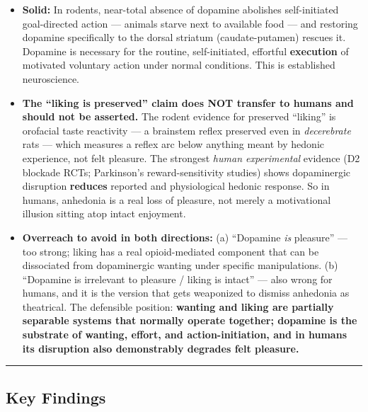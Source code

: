 \begin{itemize}
\tightlist
\item
  \textbf{Solid:} In rodents, near-total absence of dopamine abolishes self-initiated goal-directed action --- animals starve next to available food --- and restoring dopamine specifically to the dorsal striatum (caudate-putamen) rescues it. Dopamine is necessary for the routine, self-initiated, effortful \textbf{execution} of motivated voluntary action under normal conditions. This is established neuroscience.
\item
  \textbf{The ``liking is preserved'' claim does NOT transfer to humans and should not be asserted.} The rodent evidence for preserved ``liking'' is orofacial taste reactivity --- a brainstem reflex preserved even in \emph{decerebrate} rats --- which measures a reflex arc below anything meant by hedonic experience, not felt pleasure. The strongest \emph{human experimental} evidence (D2 blockade RCTs; Parkinson's reward-sensitivity studies) shows dopaminergic disruption \textbf{reduces} reported and physiological hedonic response. So in humans, anhedonia is a real loss of pleasure, not merely a motivational illusion sitting atop intact enjoyment.
\item
  \textbf{Overreach to avoid in both directions:} (a) ``Dopamine \emph{is} pleasure'' --- too strong; liking has a real opioid-mediated component that can be dissociated from dopaminergic wanting under specific manipulations. (b) ``Dopamine is irrelevant to pleasure / liking is intact'' --- also wrong for humans, and it is the version that gets weaponized to dismiss anhedonia as theatrical. The defensible position: \textbf{wanting and liking are partially separable systems that normally operate together; dopamine is the substrate of wanting, effort, and action-initiation, and in humans its disruption also demonstrably degrades felt pleasure.}
\end{itemize}

\begin{center}\rule{0.5\linewidth}{0.5pt}\end{center}

\subsection{Key Findings}\label{02_dopamine_action-key-findings}

